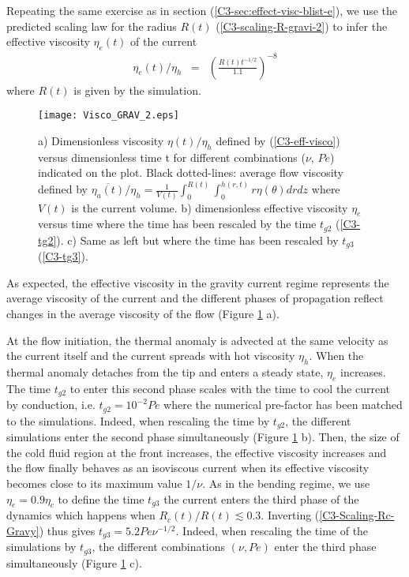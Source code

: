 Repeating      the      same      exercise     as      in      section
(\ref{C3-sec:effect-visc-blist-e}), we  use the predicted  scaling law
for  the  radius  $R(t)$  (\ref{C3-scaling-R-gravi-2})  to  infer  the
effective viscosity $\eta_e(t)$ of the current
\begin{eqnarray}
  \eta_e(t)/\eta_h&=& \left(\frac{R(t)t^{-1/2}}{1.1}\right)^{-8}\label{C3-eff-visco-grav}
\end{eqnarray}
where $R(t)$ is given by the simulation.
\begin{figure}
  \begin{center}
    \graphicspath{ {/Users/thorey/Documents/These/Projet/Refroidissement/Skin_Model/Figure/JFM_V13/} }
    \texttt{[image: Visco\_GRAV\_2.eps]}
    \caption{a)  Dimensionless viscosity  $\eta(t)/\eta_h$ defined  by
      (\ref{C3-eff-visco}) versus  dimensionless time t  for different
      combinations  ($\nu$,  $Pe$)  indicated   on  the  plot.   Black
      dotted-lines:    average     flow    viscosity     defined    by
      $\overline{\eta_a(t)}/\eta_h                                   =
      \frac{1}{V(t)}\int_0^{R(t)}\int_0^{h(r,t)} r \eta(\theta) dr dz$
      where $V(t)$ is the  current volume.  b) dimensionless effective
      viscosity $\eta_e$ versus time where  the time has been rescaled
      by the time $t_{g2}$ (\ref{C3-tg2}).   c) Same as left but where
      the time has been rescaled by $t_{g3}$ (\ref{C3-tg3}). }
    \label{C3-Visco_GRAV_2}
  \end{center}
\end{figure}

As expected,  the effective  viscosity in  the gravity  current regime
represents  the average  viscosity of  the current  and the  different
phases of propagation reflect changes  in the average viscosity of the
flow (Figure \ref{C3-Visco_GRAV_2} a).

At the  flow initiation, the thermal  anomaly is advected at  the same
velocity  as the  current  itself  and the  current  spreads with  hot
viscosity $\eta_h$. When the thermal anomaly detaches from the tip and
enters a steady state, $\eta_e$ increases.  The time $t_{g2}$ to enter
this  second  phase scales  with  the  time  to  cool the  current  by
conduction,  i.e.  $t_{g2}=10^{-2}Pe$  where the  numerical pre-factor
has been matched to the  simulations.  Indeed, when rescaling the time
by  $t_{g2}$,  the  different   simulations  enter  the  second  phase
simultaneously (Figure  \ref{C3-Visco_GRAV_2} b).   Then, the  size of
the cold fluid region at  the front increases, the effective viscosity
increases and the  flow finally behaves as an  isoviscous current when
its effective  viscosity becomes close  to its maximum  value $1/\nu$.
As in  the bending regime, we  use $\eta_e = 0.9\eta_c$  to define the
time $t_{g3}$ the current enters the third phase of the dynamics which
happens        when        $R_c(t)/R(t)\lesssim0.3$.         Inverting
(\ref{C3-Scaling-Rc-Gravy})   thus   gives   $t_{g3}=5.2Pe\nu^{-1/2}$.
Indeed, when  rescaling the time  of the simulations by  $t_{g3}$, the
different combinations $(\nu,Pe)$ enter the third phase simultaneously
(Figure \ref{C3-Visco_GRAV_2} c).

